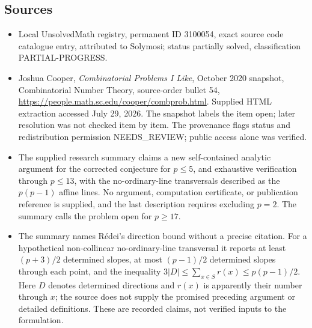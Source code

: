 \documentclass[11pt]{article}
\begin{document}
\subsection{Sources}
\begin{itemize}
\item Local UnsolvedMath registry, permanent ID 3100054, exact source code catalogue entry, attributed to Solymosi; status partially solved, classification PARTIAL-PROGRESS.
\item Joshua Cooper, \emph{Combinatorial Problems I Like}, October 2020 snapshot, Combinatorial Number Theory, source-order bullet 54, \url{https://people.math.sc.edu/cooper/combprob.html}. Supplied HTML extraction accessed July 29, 2026. The snapshot labels the item open; later resolution was not checked item by item. The provenance flags status and redistribution permission NEEDS\_REVIEW; public access alone was verified.
\item The supplied research summary claims a new self-contained analytic argument for the corrected conjecture for $p\leq5$, and exhaustive verification through $p\leq13$, with the no-ordinary-line transversals described as the $p(p-1)$ affine lines. No argument, computation certificate, or publication reference is supplied, and the last description requires excluding $p=2$. The summary calls the problem open for $p\geq17$.
\item The summary names R\'edei's direction bound without a precise citation. For a hypothetical non-collinear no-ordinary-line transversal it reports at least $(p+3)/2$ determined slopes, at most $(p-1)/2$ determined slopes through each point, and the inequality $3|D|\leq\sum_{x\in S}r(x)\leq p(p-1)/2$. Here $D$ denotes determined directions and $r(x)$ is apparently their number through $x$; the source does not supply the promised preceding argument or detailed definitions. These are recorded claims, not verified inputs to the formulation.
\end{itemize}
\end{document}
